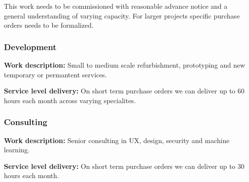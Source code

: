 This work needs to be commissioned with reasonable advance notice and a general understanding of varying capacity. For larger projects specific purchase orders needs to be formalized.

\subsubsection{Development}
\textbf{Work description:} Small to medium scale refurbishment, prototyping and new temporary or permantent services.

\textbf{Service level delivery:} On short term purchase orders we can deliver up to 60 hours each month across varying specialites.

\subsubsection{Consulting}
\textbf{Work description:} Senior consulting in UX, design, security and machine learning.

\textbf{Service level delivery:} On short term purchase orders we can deliver up to 30 hours each month.


